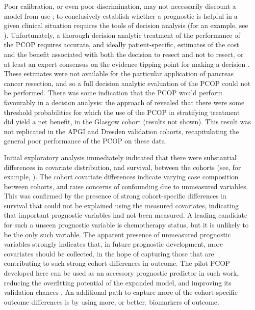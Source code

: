 \documentclass[dissertation.tex]{subfiles}
\begin{document}
Poor calibration, or even poor discrimination, may not necessarily discount a model from use \cite{Steyerberg2010}; to conclusively establish whether a prognostic is helpful in a given clinical situation requires the tools of decision analysis (for an example, see \cite{Vickers2008}).  Unfortunately, a thorough decision analytic treatment of the performance of the \gls{PCOP} requires accurate, and ideally patient-specific, estimates of the cost and the benefit associated with both the decision to resect and not to resect, or at least an expert consensus on the evidence tipping point for making a decision \cite{Vickers2008}.  These estimates were not available for the particular application of pancreas cancer resection, and so a full decision analytic evaluation of the \gls{PCOP} could not be performed.  There was some indication that the \gls{PCOP} would perform favourably in a decision analysis: the approach of \cite{Vickers2008} revealed that there were some threshold probabilities for which the use of the \gls{PCOP} in stratifying treatment did yield a net benefit, in the Glasgow cohort (results not shown).  This result was not replicated in the \gls{APGI} and Dresden validation cohorts, recapitulating the general poor performance of the \gls{PCOP} on these data.

Initial exploratory analysis immediately indicated that there were substantial differences in covariate distribution, and survival, between the cohorts (see, for example, ).  The cohort covariate differences indicate varying case composition between cohorts, and raise concerns of confounding due to unmeasured variables.  This was confirmed by the presence of strong cohort-specific differences in survival that could not be explained using the measured covariates, indicating that important prognostic variables had not been measured.  A leading candidate for such a unseen prognostic variable is chemotherapy status, but it is unlikely to be the only such variable.  The apparent presence of unmeasured prognostic variables strongly indicates that, in future prognostic development, more covariates should be collected, in the hope of capturing those that are contributing to such strong cohort differences in outcome.  The pilot \gls{PCOP} developed here can be used as an accessory prognostic predictor in such work, reducing the overfitting potential of the expanded model, and improving its validation chances \cite{VanHouwelingen2000}.  An additional path to capture more of the cohort-specific outcome differences is by using more, or better, biomarkers of outcome.
\end{document}
